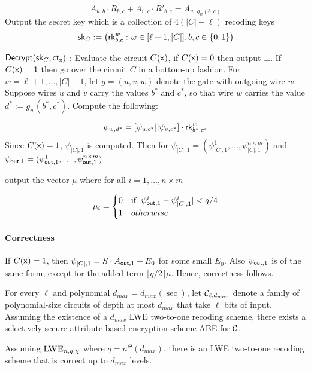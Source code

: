 $$A_{u,b}\cdot R_{b,c}+A_{v,c}\cdot R'_{b,c}=A_{w,g_w(b,c)}$$
Output the secret key which is a collection of $4(|C|-\ell)$ recoding keys
$${\mathsf{sk}}_C := \big({\mathsf{rk}}^w_{b,c}: w\in[\ell+1,|C|],b,c\in\{0,1\} \big)$$


\item $\mathsf{Decrypt}({\mathsf{sk}}_C, {\mathsf{ct}}_{\mathsf{x}})$ : Evaluate the circuit $C(\mathsf{x})$, if $C(\mathsf{x})= 0$ then output $\bot$. If $C(\mathsf{x})= 1$ then go over the circuit $C$ in a bottom-up fashion. For $w = \ell+1,\ldots,|C|-1$, let
$g = (u, v,w)$ denote the gate with outgoing wire $w$. Suppose wires $u$ and $v$ carry the values $b^*$
and $c^*$, so that wire $w$ carries the value $d^* := g_w(b^*,c^*)$. Compute the following: 

$$\psi_{w,d^*}=[\psi_{u,b^*}||\psi_{v,c^*}] \cdot {\mathsf{rk}}^w_{b^*,c^*}$$
Since $C(\mathsf{x})= 1$, $\psi_{|C|,1}$ is computed. Then for $\psi_{|C|,1}=(\psi_{|C|,1}^1,\ldots,\psi_{|C|,1}^{n\times m})$ and $\psi_{\mathsf{out},1}=(\psi_{\mathsf{out},1}^1,\ldots,\psi_{\mathsf{out},1}^{n\times m})$

output the vector $\mu$ where for all $i = 1,\ldots,n\times m$ 

    
    \begin{align*}\mu_i = \begin{cases} 0 & \text{if } |\psi_{\out,1}^i-\psi_{|C|,1}^i|<q/4 \\
                        1                                & otherwise     %
        \end{cases}\end{align*}
\EI



\paragraph{Correctness} If $C(\mathsf{x})= 1$, then $\psi_{|C|,1}=S\cdot A_{\mathsf{out},1} +E_0$ for some small $E_0$. Also $\psi_{\mathsf{out},1}$ is of the same form, except for the added term $\lceil q/2\rceil \mu$. Hence, correctness follows.

For every $\ell$ and polynomial $d_{max} = d_{max}(\sec)$, let ${\cal C}_{\ell,d_{max}}$ denote a family of
polynomial-size circuits of depth at most $d_{max}$ that take $\ell$ bits of input. Assuming the existence
of a $d_{max}$ LWE two-to-one recoding scheme, there exists a selectively secure attribute-based encryption scheme ABE for
${\cal C}$.
\ET

Assuming $\textsc{LWE}_{n,q,\chi}$ where $q=n^\Theta(d_{max})$, there is an LWE two-to-one recoding scheme that is correct up to $d_{max}$ levels. 
\EL

